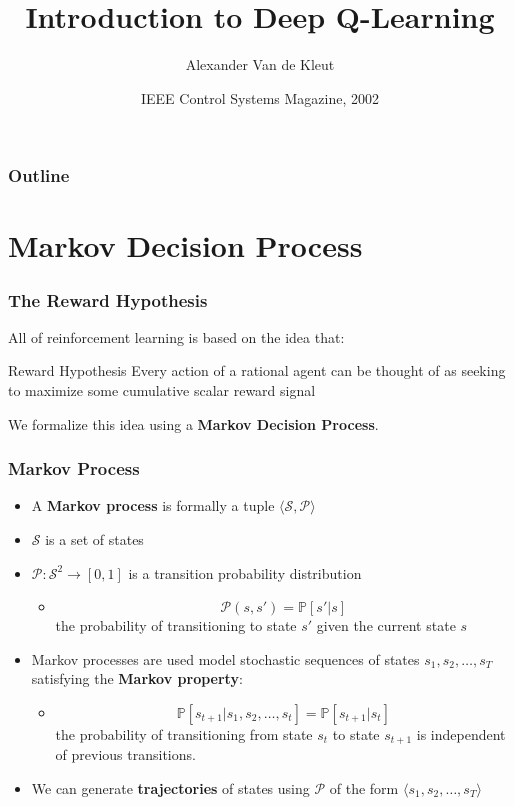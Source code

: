\documentclass{beamer}
\title[DQN]{Introduction to Deep Q-Learning}
\author[Van de Kleut]{
  Alexander Van de Kleut\inst{1}
}
\institute[UW]{\inst{1}
  \inst{1}
  NeuroCog Lab
  Cheriton School of Computer Science
  University of Waterloo\\
}
\date[W20]{IEEE Control Systems Magazine, 2002}
\begin{document}
\frame{\titlepage}

\begin{frame}
\frametitle{Outline}
\tableofcontents
\end{frame}

\section{Markov Decision Process}
\begin{frame}
  \frametitle{The Reward Hypothesis}
  All of reinforcement learning is based on the idea that:
  \begin{block}{Reward Hypothesis}
    Every action of a rational agent can be thought of as seeking to maximize some cumulative scalar reward signal
  \end{block}
  We formalize this idea using a \textbf{Markov Decision Process}.
\end{frame}

\begin{frame}
  \frametitle{Markov Process}
  \begin{itemize}
    \item A \textbf{Markov process} is formally a tuple $\langle \mathcal{S}, \mathcal{P} \rangle$
    \item $\mathcal{S}$ is a set of states
    \item $\mathcal{P}: \mathcal{S}^2 \to \left[ 0, 1 \right]$ is a transition probability distribution
    \begin{itemize}
      \item $$\mathcal{P}(s, s') = \mathbb{P} \left[ s' \vert s \right]$$ the probability of transitioning to state $s'$ given the current state $s$
    \end{itemize}
    \item Markov processes are used model stochastic sequences of states $s_1, s_2, \dots, s_T$ satisfying the \textbf{Markov property}:
    \begin{itemize}
      \item $$\mathbb{P} \left[ s_{t+1} \vert s_1, s_2, \dots, s_t \right] = \mathbb{P} \left[ s_{t+1} \vert s_t \right]$$ the probability of transitioning from state $s_t$ to state $s_{t+1}$ is independent of previous transitions.
    \end{itemize}
    \item We can generate \textbf{trajectories} of states using $\mathcal{P}$ of the form $\langle s_1, s_2, \dots, s_T \rangle$
  \end{itemize}
\end{frame}
\end{document}
